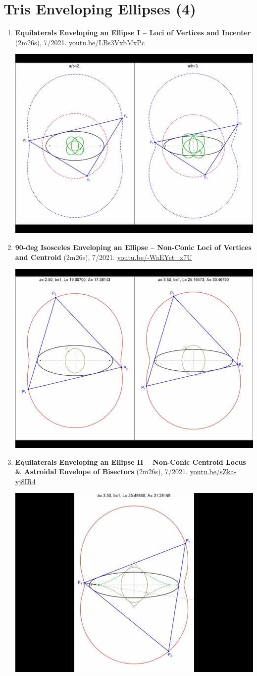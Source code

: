 \documentclass[12pt]{article}
\begin{document}
\section{Tris Enveloping Ellipses (4)}

\begin{enumerate}[resume]
\item \textbf{Equilaterals Enveloping an Ellipse I -- Loci of Vertices and Incenter} (2m26s), 7/2021. \href{https://youtu.be/LBs3VxbMxPc}{\url{youtu.be/LBs3VxbMxPc}}
\begin{center}\includegraphics[width=.5\textwidth]{pics/LBs3VxbMxPc.jpg}\end{center}
% 
\item \textbf{90-deg Isosceles Enveloping an Ellipse -- Non-Conic Loci of Vertices and Centroid} (2m26s), 7/2021. \href{https://youtu.be/-WaEYct_x7U}{\url{youtu.be/-WaEYct\_x7U}}
\begin{center}\includegraphics[width=.5\textwidth]{pics/-WaEYct_x7U.jpg}\end{center}
% 
\item \textbf{Equilaterals Enveloping an Ellipse II -- Non-Conic Centroid Locus \& Astroidal Envelope of Bisectors} (2m26s), 7/2021. \href{https://youtu.be/sZka-yj8IR4}{\url{youtu.be/sZka-yj8IR4}}
\begin{center}\includegraphics[width=.5\textwidth]{pics/sZka-yj8IR4.jpg}\end{center}

\end{enumerate}
\end{document}
